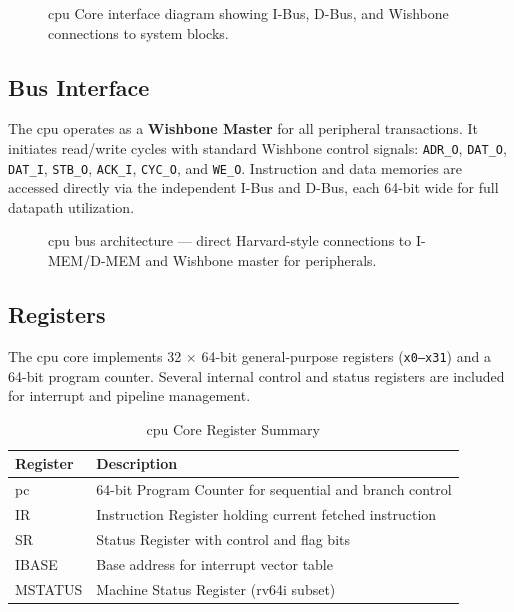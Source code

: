 \begin{figure}[H]
    \centering
    \caption{\gls{cpu} Core interface diagram showing I-Bus, D-Bus, and Wishbone connections to system blocks.}
    \label{fig:cpu_interface}
\end{figure}

\subsection{Bus Interface}
The \gls{cpu} operates as a \textbf{Wishbone Master} for all peripheral transactions.
It initiates read/write cycles with standard Wishbone control signals:
\texttt{ADR\_O}, \texttt{DAT\_O}, \texttt{DAT\_I}, \texttt{STB\_O}, \texttt{ACK\_I}, \texttt{CYC\_O}, and \texttt{WE\_O}.  
Instruction and data memories are accessed directly via the independent I-Bus and D-Bus, each 
64-bit wide for full datapath utilization.

\begin{figure}[H]
    \centering
    \caption{\gls{cpu} bus architecture — direct \gls{Harvard}-style connections to \gls{I-MEM}/\gls{D-MEM} and Wishbone master for peripherals.}
    \label{fig:cpu_bus_arch}
\end{figure}

\subsection{Registers}
The \gls{cpu} core implements 32 × 64-bit general-purpose registers (\texttt{x0–x31}) and a 64-bit program counter.
Several internal control and status registers are included for interrupt and \gls{pipeline} management.

\begin{table}[H]
    \centering
    \caption{\gls{cpu} Core Register Summary}
    \label{tab:cpu_registers}
    \begin{tabular}{|l|l|}
        \hline
        \textbf{Register} & \textbf{Description} \\ \hline
        \gls{pc} & 64-bit Program Counter for sequential and branch control \\ \hline
        IR & Instruction Register holding current fetched instruction \\ \hline
        SR & Status Register with control and flag bits \\ \hline
        IBASE & Base address for interrupt vector table \\ \hline
        MSTATUS & Machine Status Register (\gls{rv64i} subset) \\ \hline
    \end{tabular}
\end{table}

